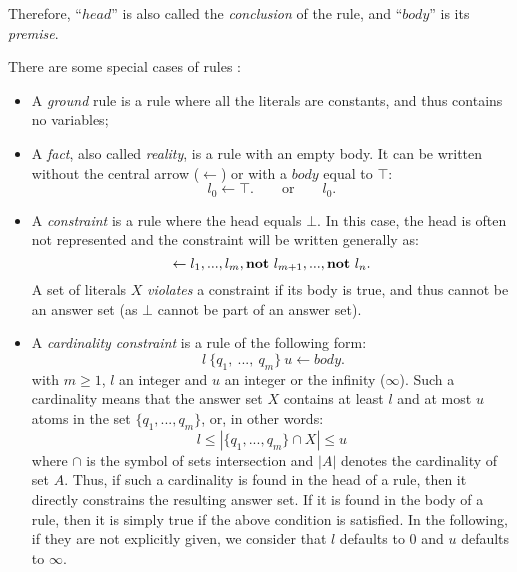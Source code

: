 \begin{enumerate}
Therefore, ``$head$'' is also called the \emph{conclusion} of the rule,
and ``$body$'' is its \emph{premise}.

There are some special cases of rules \cite{Vladimir,baral2003knowledge}:
\begin{itemize}
\item A \emph{ground} rule is a rule where all the literals are constants,
  and thus contains no variables;

\item A \emph{fact}, also called \emph{reality}, is a rule with an empty body.
  It can be written without the central arrow ($\leftarrow$) or with a $body$ equal to $\top$:
\begin{equation} 
l_{0} \leftarrow \top. \qquad \text{or} \qquad l_{0}.
 \label{eq5ASP}
\end{equation}

\item A \emph{constraint} is a rule where the head equals $\bot$.
  In this case, the head is often not represented and the constraint will be written generally as:
\begin{equation} 
  \leftarrow l_{1},...,l_{m}, \textbf{not}~ l_{m+1},..., \textbf{not}~ l_{n}.
  \label{eq6ASP}
\end{equation}
A set of literals $X$ \emph{violates} a constraint if
its body is true, and thus cannot be an answer set
(as $\bot$ cannot be part of an answer set).

\item A \emph{cardinality constraint} is a rule of the following form:
\begin{equation} 
 ~ l ~\{q_{1},~ ... ,~ q_{m}\}~ u \leftarrow body.
 \label{eq7ASP}
\end{equation}
with $m \geq 1$, $l$ an integer and $u$ an integer or the infinity ($\infty$).
Such a cardinality means that the answer set $X$ contains
at least $l$ and at most $u$ atoms in the set $\{q_{1}, ... , q_{m}\}$,
or, in other words:
\begin{equation}
  l \leq | \{q_{1},... , q_{m}\} \cap X | \leq u
\end{equation}
where $\cap$ is the symbol of sets intersection
and $|A|$ denotes the cardinality of set $A$.
Thus, if such a cardinality is found in the head of a rule,
then it directly constrains the resulting answer set.
If it is found in the body of a rule,
then it is simply true if the above condition is satisfied.
In the following, if they are not explicitly given,
we consider that $l$ defaults to $0$ and $u$ defaults to $\infty$.

\end{itemize}


\end{enumerate}

